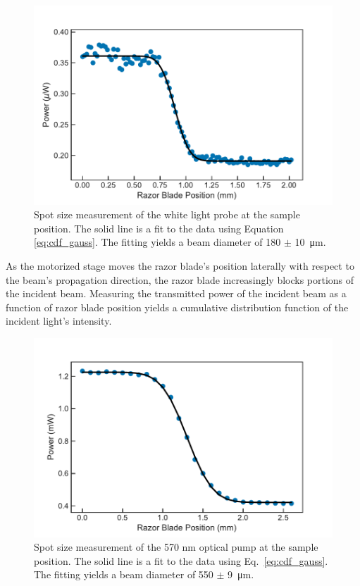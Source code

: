 \begin{figure}[ht]
	\centering
	\includegraphics[scale=0.65]{images/chapter_methods/probe_spot_size}
	\caption{Spot size measurement of the white light probe at the sample position. The solid line is a fit to the data using Equation \ref{eq:cdf_gauss}. The fitting yields a beam diameter of 180 $\pm$ \SI{10}{\micro\meter}. }
\end{figure}


As the motorized stage moves the razor blade's position laterally with respect to the beam's propagation direction, the razor blade increasingly blocks portions of the incident beam.  Measuring the transmitted power of the incident beam as a function of razor blade position yields a cumulative distribution function of the incident light's intensity.

\begin{figure}[ht]
	\centering
	\includegraphics[scale=0.65]{images/chapter_methods/pump_spot_size}
	\caption{Spot size measurement of the 570 nm optical pump at the sample position. The solid line is a fit to the data using Eq.\ \ref{eq:cdf_gauss}. The fitting yields a beam diameter of 550 $\pm$ \SI{9}{\micro\meter}.}
\end{figure}


